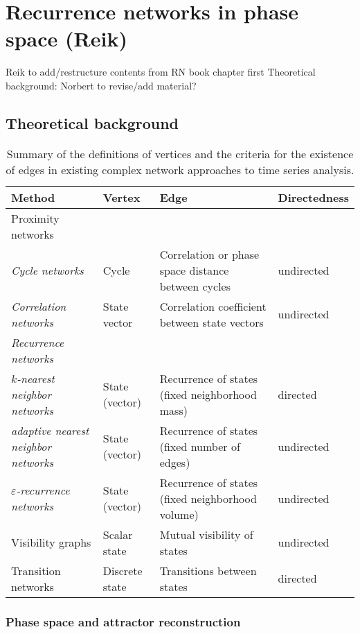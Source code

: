 \section{Recurrence networks in phase space {\bf{(Reik)}}}

Reik to add/restructure contents from RN book chapter first
Theoretical background: Norbert to revise/add material?

\subsection{Theoretical background}

\begin{table}[t]%
\caption{Summary of the definitions of vertices and the criteria for the
existence of edges in existing complex network approaches to time series analysis.}{
\small
\begin{tabular}{llll}
\hline
Method & Vertex & Edge & Directedness \\
\hline
Proximity networks & & \\
\textit{Cycle networks} & Cycle & Correlation or phase space distance between cycles & undirected \\
\textit{Correlation networks} & State vector & Correlation coefficient between state vectors & undirected \\
\textit{Recurrence networks} & & & \\
\quad \textit{$k$-nearest neighbor networks}& State (vector) & Recurrence of states (fixed neighborhood mass) & directed \\
\quad \textit{adaptive nearest neighbor networks}& State (vector)  & Recurrence of states (fixed number of edges) & undirected \\
\quad \textit{$\varepsilon$-recurrence networks} & State (vector) & Recurrence of states (fixed neighborhood volume) & undirected \\
\hline
Visibility graphs & Scalar state & Mutual visibility of states & undirected \\
\hline
Transition networks & Discrete state & Transitions between states & directed \\
\hline
\end{tabular}
\normalsize
\label{tab:methods}}
\end{table}


		\subsubsection{Phase space and attractor reconstruction}
